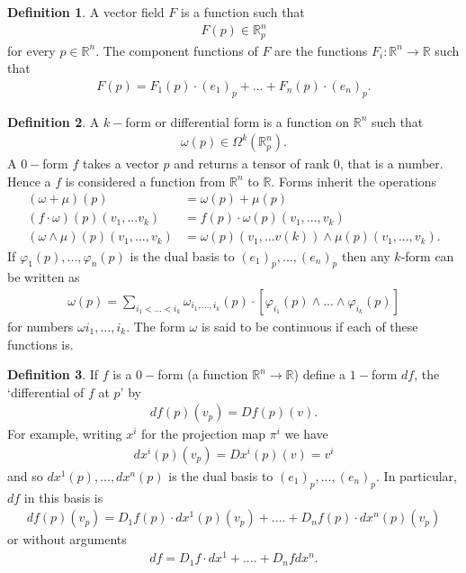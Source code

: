 \documentclass[20pt]{article}
\theoremstyle{plain}
\theoremstyle{definition}
\newtheorem{definition}{Definition}
\newcommand{\reals}{\mathbb{R}}
\begin{document}
\begin{definition}
  A vector field $F$ is a function such that 
  \begin{align*}
    F(p) \in \reals^n_p
  \end{align*}
  for every $p \in \reals^n.$  The component functions of $F$ are the functions 
  $F_i: \reals^n \to \reals$ such that 
  \begin{align*}
    F(p) = F_1(p)\cdot(e_1)_p + ... + F_n(p)\cdot(e_n)_p.
  \end{align*}
\end{definition}

\begin{definition}
  A $k-$form or differential form is a function on $\reals^n$ such that
  \begin{align*}
    \omega(p) \in \Omega^k(\reals^n_p).
  \end{align*}
  A $0-$form $f$ takes a vector $p$ and returns a tensor of rank $0$, that is a number.
  Hence a $f$ is considered a function from $\reals^n$ to $\reals.$
  Forms inherit the operations
  \begin{align*}
    (\omega + \mu)(p) &= \omega(p) + \mu(p)\\
    (f \cdot \omega)(p)(v_1, ...v_k) &= f(p) \cdot \omega(p)(v_1, ..., v_k)\\
    (\omega \wedge \mu)(p)(v_1, ..., v_k) &= \omega(p)(v_1,...v(k)) \wedge \mu(p)(v_1, ..., v_k).
  \end{align*}
  If $\varphi_1(p), ..., \varphi_n(p)$ is the dual basis to $(e_1)_p, ..., (e_n)_p$ then any $k$-form can be written as
  \begin{align*}
    \omega(p) = \sum_{i_1<...<i_k} \omega_{i_1, ..., i_k}(p)\cdot[\varphi_{i_1}(p)\wedge...\wedge\varphi_{i_k}(p)]
  \end{align*}
  for numbers $\omega{i_1,...,i_k}$.  The form $\omega$ is said to be continuous if each of these functions is.

  \end{definition}

  \begin{definition}
    If $f$ is a $0-$form (a function $\reals^n \to \reals$) define a $1-$form $df$, the  `differential of $f$ at $p$' by
    \begin{align*}
      df(p)(v_p) = Df(p)(v).
    \end{align*}
    For example, writing $x^i$ for the projection map $\pi^i$ we have 
    \begin{align*}
      dx^i(p)(v_p) = Dx^i(p)(v) = v^i
    \end{align*}
    and so $dx^1(p), ..., dx^n(p)$ is the dual basis to $(e_1)_p, ..., (e_n)_p.$ 
    In particular, $df$ in this basis is 
    \begin{align*}
      df(p)(v_p) = D_1f(p) \cdot dx^1(p)(v_p) + .... + D_nf(p)\cdot dx^n(p)(v_p)
    \end{align*}
    or without arguments 
    \begin{align*}
      df = D_1f\cdot dx^1 + .... + D_nf dx^n.
    \end{align*}
  \end{definition}
\end{document}

